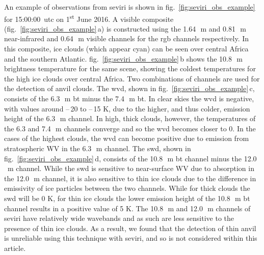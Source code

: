 \documentclass[acp, manuscript]{copernicus}
\begin{document}
%
%
%
%

An example of observations from \acrshort{seviri} is shown in fig.~\ref{fig:seviri_obs_example} for 15:00:00~\acrshort{utc} on 1\textsuperscript{st} June 2016. 
A visible composite (fig.~\ref{fig:seviri_obs_example}\,a) is constructed using the 1.64\,\unit{\mu m} and 0.81\,\unit{\mu m} near-infrared and 0.64\,\unit{\mu m} visible channels for the \acrfull{rgb} channels respectively. 
In this composite, ice clouds (which appear cyan) can be seen over central Africa and the southern Atlantic. fig.~\ref{fig:seviri_obs_example}\,b shows the 10.8\,\unit{\mu m} brightness temperature for the same scene, showing the coldest temperatures for the high ice clouds over central Africa. 
Two combinations of channels are used for the detection of anvil clouds. 
The \acrfull{wvd}, shown in fig.~\ref{fig:seviri_obs_example}\,c, consists of the 6.3\,\unit{\mu m} \acrshort{bt} minus the 7.4\,\unit{\mu m} \acrshort{bt}. 
In clear skies the \acrshort{wvd} is negative, with values around --\,20 to --\,15 K, due to the higher, and thus colder, emission height of the 6.3\,\unit{\mu m} channel. 
In high, thick clouds, however, the temperatures of the 6.3 and 7.4\,\unit{\mu m} channels converge and so the \acrshort{wvd} becomes closer to 0. 
In the cases of the highest clouds, the \acrshort{wvd} can become positive due to emission from stratospheric WV in the 6.3\,\unit{\mu m} channel. The \acrfull{swd}, shown in fig.~\ref{fig:seviri_obs_example}\,d, consists of the 10.8\,\unit{\mu m} \acrshort{bt} channel minus the 12.0\,\unit{\mu m} channel. 
While the \acrshort{swd} is sensitive to near-surface WV due to absorption in the 12.0\,\unit{\mu m} channel, it is also sensitive to thin ice clouds due to the difference in emissivity of ice particles between the two channels. 
While for thick clouds the \acrshort{swd} will be 0 K, for thin ice clouds the lower emission height of the 10.8\,\unit{\mu m} \acrshort{bt} channel results in a positive value of 5 K.
The 10.8\,\unit{\mu m} and 12.0\,\unit{\mu m} channels of \acrshort{seviri} have relatively wide wavebands and as such are less sensitive to the presence of thin ice clouds.
As a result, we found that the detection of thin anvil is unreliable using this technique with \acrshort{seviri}, and so is not considered within this article.
\end{document}
